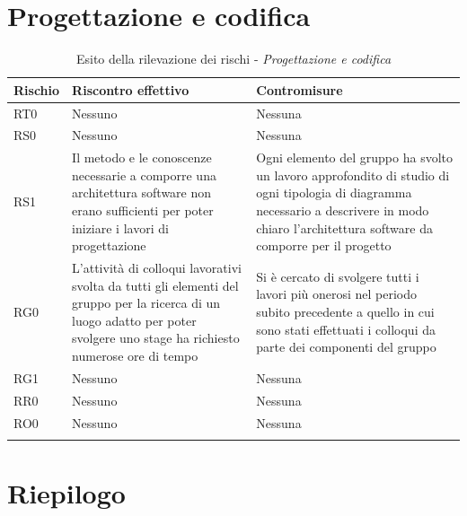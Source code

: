 \documentclass[./PianodiProgetto.tex]{subfiles}
\begin{document}
\section{Progettazione e codifica}

\setlength\LTleft{-5.5mm}

\begin{longtable}{|p{15mm}|p{60mm}|p{60mm}|}
	\hline \textbf{Rischio} & \textbf{Riscontro effettivo} & \textbf{Contromisure} \\
	
	\hline RT0 & Nessuno & Nessuna \\
	
	\hline RS0 & Nessuno & Nessuna \\
	
	\hline RS1 & Il metodo e le conoscenze necessarie a comporre una architettura software non erano sufficienti per poter iniziare i lavori di progettazione & Ogni elemento del gruppo ha svolto un lavoro approfondito di studio di ogni tipologia di diagramma necessario a descrivere in modo chiaro l'architettura software da comporre per il progetto \\
	
	\hline RG0 & L'attività di colloqui lavorativi svolta da tutti gli elementi del gruppo per la ricerca di un luogo adatto per poter svolgere uno stage ha richiesto numerose ore di tempo & Si è cercato di svolgere tutti i lavori più onerosi nel periodo subito precedente a quello in cui sono stati effettuati i colloqui da parte dei componenti del gruppo \\
	
	\hline RG1 & Nessuno & Nessuna \\
	
	\hline RR0 & Nessuno & Nessuna \\
	
	\hline RO0 & Nessuno & Nessuna \\
	
	\hline
	\caption{Esito della rilevazione dei rischi - \textit{Progettazione e codifica}}
\end{longtable}

\section{Riepilogo}

\setlength\LTleft{40mm}
\end{document}
